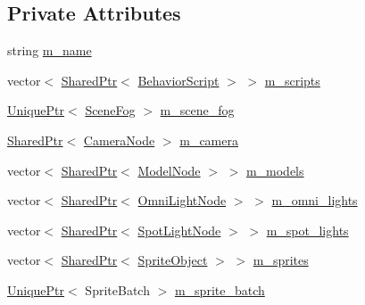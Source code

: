 \subsection*{Private Attributes}
\begin{DoxyCompactItemize}
\item 
string \hyperlink{classmage_1_1_scene_a6cc8cb08b1853c4e3063b33a94e8fb47}{m\+\_\+name}
\item 
vector$<$ \hyperlink{namespacemage_a1e01ae66713838a7a67d30e44c67703e}{Shared\+Ptr}$<$ \hyperlink{classmage_1_1_behavior_script}{Behavior\+Script} $>$ $>$ \hyperlink{classmage_1_1_scene_a84548bf6978f8955ce5892cb23536a4e}{m\+\_\+scripts}
\item 
\hyperlink{namespacemage_a3316d7143a973e37adf1110f2e80ca31}{Unique\+Ptr}$<$ \hyperlink{structmage_1_1_scene_fog}{Scene\+Fog} $>$ \hyperlink{classmage_1_1_scene_a58f8d29322664c4c5895703a6cbc9000}{m\+\_\+scene\+\_\+fog}
\item 
\hyperlink{namespacemage_a1e01ae66713838a7a67d30e44c67703e}{Shared\+Ptr}$<$ \hyperlink{classmage_1_1_camera_node}{Camera\+Node} $>$ \hyperlink{classmage_1_1_scene_a39c785951d9fb99477c1894eabba0cc6}{m\+\_\+camera}
\item 
vector$<$ \hyperlink{namespacemage_a1e01ae66713838a7a67d30e44c67703e}{Shared\+Ptr}$<$ \hyperlink{classmage_1_1_model_node}{Model\+Node} $>$ $>$ \hyperlink{classmage_1_1_scene_a01132a667fbc1517f11ae561bc221071}{m\+\_\+models}
\item 
vector$<$ \hyperlink{namespacemage_a1e01ae66713838a7a67d30e44c67703e}{Shared\+Ptr}$<$ \hyperlink{namespacemage_a1724c6e6b6b5ba535cdd967cbbb4a669}{Omni\+Light\+Node} $>$ $>$ \hyperlink{classmage_1_1_scene_a881c3dd7e85e5069650f29fd2722bf78}{m\+\_\+omni\+\_\+lights}
\item 
vector$<$ \hyperlink{namespacemage_a1e01ae66713838a7a67d30e44c67703e}{Shared\+Ptr}$<$ \hyperlink{namespacemage_aeed5dee4ff6c591eabb0e9114256df4a}{Spot\+Light\+Node} $>$ $>$ \hyperlink{classmage_1_1_scene_a4e1954bc0b812d6a71123ca3ac9eeb75}{m\+\_\+spot\+\_\+lights}
\item 
vector$<$ \hyperlink{namespacemage_a1e01ae66713838a7a67d30e44c67703e}{Shared\+Ptr}$<$ \hyperlink{classmage_1_1_sprite_object}{Sprite\+Object} $>$ $>$ \hyperlink{classmage_1_1_scene_a7379b399f02999f89f6ccda5bfa01b02}{m\+\_\+sprites}
\item 
\hyperlink{namespacemage_a3316d7143a973e37adf1110f2e80ca31}{Unique\+Ptr}$<$ Sprite\+Batch $>$ \hyperlink{classmage_1_1_scene_a8143ca7b1840da552d94e698010730c5}{m\+\_\+sprite\+\_\+batch}

\end{DoxyCompactItemize}
